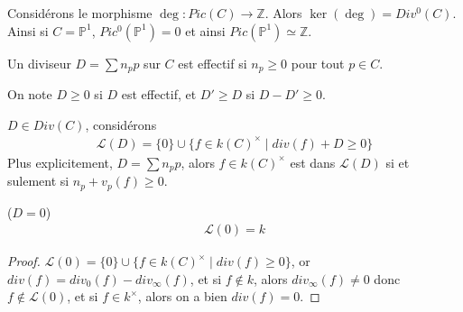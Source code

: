         \begin{remq}
            Considérons le morphisme $\deg : Pic(C) \to \mathbb{Z}$. Alors $\ker(\deg) = Div^0(C)$. Ainsi si $C = \mathbb{P}^1$, $Pic^0(\mathbb{P}^1) = 0$ et ainsi $Pic(\mathbb{P}^1) \simeq \mathbb{Z}$.
        \end{remq}
        \begin{defi}
            Un diviseur $D = \sum n_pp$ sur $C$ est effectif si $n_p \geq 0$ pour tout $p \in C$.
        \end{defi}
        \begin{nota}
            On note $D \geq 0$ si $D$ est effectif, et $D' \geq D$ si $D - D' \geq 0$.
        \end{nota}
        \begin{nota}
            $D \in Div(C)$, considérons
            \begin{align*}
                \mathcal{L}(D) = \{0\} \cup \{f \in k(C)^\times \mid div(f) + D \geq 0\}
            \end{align*}
            Plus explicitement, $D = \sum n_pp$, alors $f \in k(C)^\times$ est dans $\mathcal{L}(D)$ si et sulement si $n_p + v_p(f) \geq 0$.
        \end{nota}
        \begin{lemm} ($D = 0$)
            \label{d=0}
            \begin{align*}
                \mathcal{L}(0) = k
            \end{align*}
        \end{lemm}
        \begin{proof}
            $\mathcal{L}(0) = \{0\} \cup \{f \in k(C)^\times \mid div(f) \geq 0\}$, or $div(f) = div_0(f) - div_\infty(f)$, et si $f \notin k$, alors $div_\infty(f) \neq 0$ donc $f \notin \mathcal{L}(0)$, et si $f \in k^\times$, alors on a bien $div(f) = 0$.
        \end{proof}
